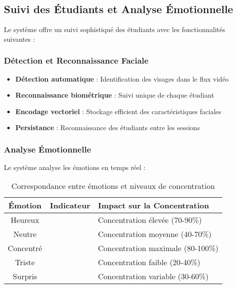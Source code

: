 \documentclass[12pt,a4paper]{article}
\begin{document}
\subsection{Suivi des Étudiants et Analyse Émotionnelle}

Le système offre un suivi sophistiqué des étudiants avec les fonctionnalités suivantes :

\subsubsection{Détection et Reconnaissance Faciale}
\begin{itemize}
    \item \textbf{Détection automatique} : Identification des visages dans le flux vidéo
    \item \textbf{Reconnaissance biométrique} : Suivi unique de chaque étudiant
    \item \textbf{Encodage vectoriel} : Stockage efficient des caractéristiques faciales
    \item \textbf{Persistance} : Reconnaissance des étudiants entre les sessions
\end{itemize}

\subsubsection{Analyse Émotionnelle}
Le système analyse les émotions en temps réel :

\begin{table}[H]
\centering
\begin{tabular}{|c|p{3cm}|p{5cm}|}
\hline
\rowcolor{lightblue}
\textbf{Émotion} & \textbf{Indicateur} & \textbf{Impact sur la Concentration} \\
\hline
Heureux & \textcolor{green}{} & Concentration élevée (70-90\%) \\
\hline
Neutre & \textcolor{orange}{} & Concentration moyenne (40-70\%) \\
\hline
Concentré & \textcolor{green}{} & Concentration maximale (80-100\%) \\
\hline
Triste & \textcolor{red}{} & Concentration faible (20-40\%) \\
\hline
Surpris & \textcolor{orange}{} & Concentration variable (30-60\%) \\
\hline
\end{tabular}
\caption{Correspondance entre émotions et niveaux de concentration}
\end{table}
\end{document}
